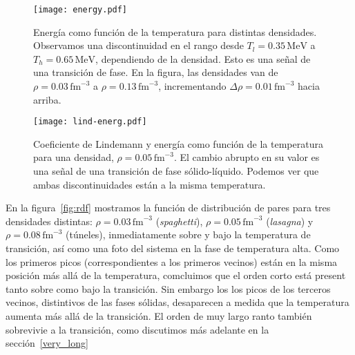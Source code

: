 \documentclass[twocolumn,showpacs]{revtex4-1}
\begin{document}
\begin{figure}[h!]  \centering
\texttt{[image: energy.pdf]}
\caption{Energía como función de la temperatura para distintas densidades.
  Observamos una discontinuidad en el rango desde $T_l=0.35\,\text{MeV}$ a $T_h=0.65\,\text{MeV}$, dependiendo de la densidad.
  Esto es una señal de una transición de fase.
  En la figura, las densidades van de $\rho=0.03\,\text{fm}^{-3}$ a $\rho=0.13\,\text{fm}^{-3}$, incrementando $\Delta\rho=0.01\,\text{fm}^{-3}$ hacia arriba.}
\label{fig:energy}
\end{figure}

\begin{figure}[h!]  \centering
\texttt{[image: lind-energ.pdf]}
\caption{Coeficiente de Lindemann y energía como función de la temperatura para una densidad, $\rho=0.05\,\text{fm}^{-3}$.
  El cambio abrupto en su valor es una señal de una transición de fase sólido-líquido.
  Podemos ver que ambas discontinuidades están a la misma temperatura.}
\label{fig:lind-energ}
\end{figure}

En la figura~\ref{fig:rdf} mostramos la función de distribución de pares para tres densidades distintas: $\rho=0.03\,\text{fm}^{-3}$ (\emph{spaghetti}), $\rho=0.05\,\text{fm}^{-3}$ (\emph{lasagna}) y $\rho=0.08\,\text{fm}^{-3}$ (túneles), inmediatamente sobre y bajo la temperatura de transición, así como una foto del sistema en la fase de temperatura alta.
Como los primeros picos (correspondientes a los primeros vecinos) están en la misma posición más allá de la temperatura, comcluimos que el orden corto está present tanto sobre como bajo la transición.
Sin embargo los los picos de los terceros vecinos, distintivos de las fases sólidas, desaparecen a medida que la temperatura aumenta más allá de la transición.
El orden de muy largo ranto también sobrevivie a la transición, como discutimos más adelante en la sección~\ref{very_long}
\end{document}
